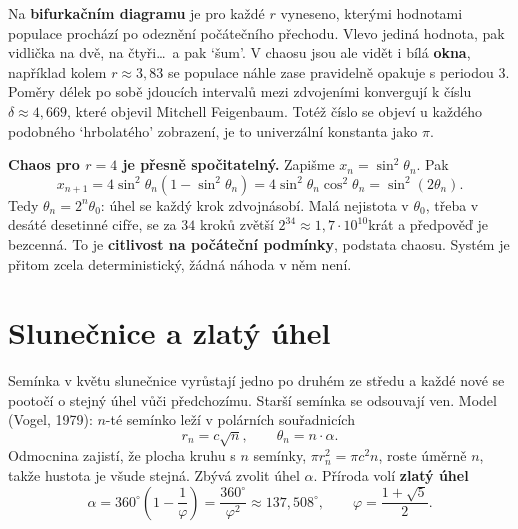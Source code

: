 Na \textbf{bifurkačním diagramu} je pro každé $r$ vyneseno, kterými hodnotami populace prochází po odeznění počátečního přechodu. Vlevo jediná hodnota, pak vidlička na dvě, na čtyři\dots\ a pak `šum'. V chaosu jsou ale vidět i bílá \textbf{okna}, například kolem $r\approx 3{,}83$ se populace náhle zase pravidelně opakuje s periodou $3$. Poměry délek po sobě jdoucích intervalů mezi zdvojeními konvergují k číslu $\delta\approx 4{,}669$, které objevil Mitchell Feigenbaum. Totéž číslo se objeví u každého podobného `hrbolatého' zobrazení, je to univerzální konstanta jako $\pi$.

\begin{example}
  \textbf{Chaos pro $r = 4$ je přesně spočitatelný.} Zapišme $x_n = \sin^2\theta_n$. Pak
  \begin{equation*}
    x_{n+1} = 4\sin^2\theta_n(1 - \sin^2\theta_n) = 4\sin^2\theta_n\cos^2\theta_n = \sin^2(2\theta_n).
  \end{equation*}
  Tedy $\theta_n = 2^n\theta_0$: úhel se každý krok zdvojnásobí. Malá nejistota v $\theta_0$, třeba v desáté desetinné cifře, se za $34$ kroků zvětší $2^{34}\approx 1{,}7\cdot 10^{10}$krát a předpověď je bezcenná. To je \textbf{citlivost na počáteční podmínky}, podstata chaosu. Systém je přitom zcela deterministický, žádná náhoda v něm není.
\end{example}

\section{Slunečnice a zlatý úhel}

Semínka v květu slunečnice vyrůstají jedno po druhém ze středu a každé nové se pootočí o stejný úhel vůči předchozímu. Starší semínka se odsouvají ven. Model (Vogel, 1979): $n$-té semínko leží v polárních souřadnicích
\begin{equation*}
  r_n = c\sqrt{n},\qquad\theta_n = n\cdot\alpha.
\end{equation*}
Odmocnina zajistí, že plocha kruhu s $n$ semínky, $\pi r_n^2 = \pi c^2n$, roste úměrně $n$, takže hustota je všude stejná. Zbývá zvolit úhel $\alpha$. Příroda volí \textbf{zlatý úhel}
\begin{equation*}
  \alpha = 360^\circ\left(1 - \frac{1}{\varphi}\right) = \frac{360^\circ}{\varphi^2}\approx 137{,}508^\circ,\qquad\varphi = \frac{1 + \sqrt{5}}{2}.
\end{equation*}

\begin{center}
\end{center}

